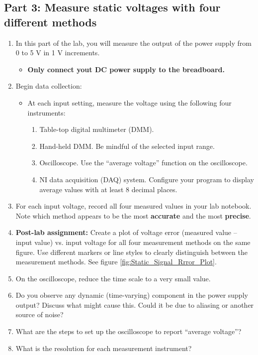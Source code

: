 \documentclass{article} %
\begin{document}
\subsection{Part 3: Measure static voltages with four different methods}
\begin{enumerate}
    \item In this part of the lab, you will measure the output of the power supply from 0 to 5 V in 1 V increments.
    \begin{itemize}
        \item \textbf{Only connect yout DC power supply to the breadboard.}
    \end{itemize}
    \item Begin data collection:
    \begin{itemize}
        \item At each input setting, measure the voltage using the following four instruments:
        \begin{enumerate}
            \item	Table-top digital multimeter (DMM).
            \item	Hand-held DMM.  Be mindful of the selected input range.
            \item	Oscilloscope. Use the ``average voltage'' function on the oscilloscope.
            \item	NI data acquisition (DAQ) system. Configure your program to display average values with at least 8 decimal places. 
        \end{enumerate}
    \end{itemize}
    \item For each input voltage, record all four measured values in your lab notebook. Note which method appears to be the most \textbf{accurate} and the most \textbf{precise}. 
    \item \textbf{Post-lab assignment:} Create a plot of voltage error (measured value – input value) vs. input voltage for all four measurement methods on the same figure. Use different markers or line styles to clearly distinguish between the measurement methods. See figure \ref{fig:Static_Signal_Rrror_Plot}.
    \item On the oscilloscope, reduce the time scale to a very small value. 
    
    \item[\textbf{Q:}] Do you observe any dynamic (time-varying) component in the power supply output? Discuss what might cause this. Could it be due to aliasing or another source of noise? 
    \item[\textbf{Q:}] What are the steps to set up the oscilloscope to report ``average voltage''?  \\
    \item[\textbf{Q:}] What is the resolution for each measurement instrument?  
\end{enumerate}
\end{document}
